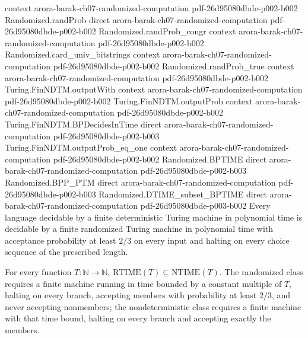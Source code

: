 \begin{theorem}
  {context}
  {arora-barak-ch07-randomized-computation}
  {pdf-26d95080dbde-p002-b002}
\proofstep
  {Randomized.randProb}
  {direct}
  {arora-barak-ch07-randomized-computation}
  {pdf-26d95080dbde-p002-b002}
\proofstep
  {Randomized.randProb_congr}
  {context}
  {arora-barak-ch07-randomized-computation}
  {pdf-26d95080dbde-p002-b002}
\proofstep
  {Randomized.card_univ_bitstrings}
  {context}
  {arora-barak-ch07-randomized-computation}
  {pdf-26d95080dbde-p002-b002}
\proofstep
  {Randomized.randProb_true}
  {context}
  {arora-barak-ch07-randomized-computation}
  {pdf-26d95080dbde-p002-b002}
\proofstep
  {Turing.FinNDTM.outputWith}
  {context}
  {arora-barak-ch07-randomized-computation}
  {pdf-26d95080dbde-p002-b002}
\proofstep
  {Turing.FinNDTM.outputProb}
  {context}
  {arora-barak-ch07-randomized-computation}
  {pdf-26d95080dbde-p002-b002}
\proofstep
  {Turing.FinNDTM.BPDecidesInTime}
  {direct}
  {arora-barak-ch07-randomized-computation}
  {pdf-26d95080dbde-p002-b003}
\proofstep
  {Turing.FinNDTM.outputProb_eq_one}
  {context}
  {arora-barak-ch07-randomized-computation}
  {pdf-26d95080dbde-p002-b002}
\proofstep
  {Randomized.BPTIME}
  {direct}
  {arora-barak-ch07-randomized-computation}
  {pdf-26d95080dbde-p002-b003}
\proofstep
  {Randomized.BPP_PTM}
  {direct}
  {arora-barak-ch07-randomized-computation}
  {pdf-26d95080dbde-p002-b003}
\proofstep
  {Randomized.DTIME_subset_BPTIME}
  {direct}
  {arora-barak-ch07-randomized-computation}
  {pdf-26d95080dbde-p003-b002}
Every language decidable by a finite deterministic Turing machine in polynomial time is
decidable by a finite randomized Turing machine in polynomial time with acceptance
probability at least $2/3$ on every input and halting on every choice sequence of the
prescribed length.
\end{theorem}

\begin{theorem}
\label{Randomized.RTIME_subset_NTIME}
\leanok
{}
For every function $T : \mathbb{N} \to \mathbb{N}$, $\mathrm{RTIME}(T) \subseteq
\mathrm{NTIME}(T)$. The randomized class requires a finite machine running in time
bounded by a constant multiple of $T$, halting on every branch, accepting members with
probability at least $2/3$, and never accepting nonmembers; the nondeterministic class
requires a finite machine with that time bound, halting on every branch and accepting
exactly the members.
\end{theorem}

